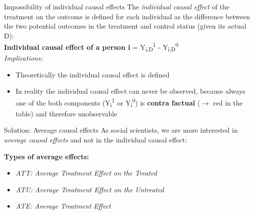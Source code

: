 \documentclass{beamer}\usepackage[]{graphicx}\usepackage[]{xcolor}
\begin{document}
\begin{frame}{Impossibility of individual causal effects}
The \textit{individual causal effect} of the treatment on the outcome is defined for each individual as the difference between the two potential outcomes in the treatment and control status (given its actual D):\\
\textbf{Individual causal effect of a person i} = Y\textsubscript{i,D}\textsuperscript{1} - Y\textsubscript{i,D}\textsuperscript{0} \\[1em]
\textit{Implications:} 
  \begin{itemize}
    \item Theoretically the individual causal effect is defined
    \item In reality the individual causal effect can never be observed, because always one of the both components (Y\textsubscript{i}\textsuperscript{1} or Y\textsubscript{i}\textsuperscript{0}) is \textbf{contra factual} ($\rightarrow$ red in the table) and therefore unobservable
  \end{itemize}
\end{frame}


\begin{frame}{Solution: Average causal effects}
As social scientists, we are more interested in \textit{average causal effects} and not in the individual causal effect:

\textbf{Types of average effects:}
  \begin{itemize}
    \item \textit{ATT: Average Treatment Effect on the Treated}
    \item \textit{ATU: Average Treatment Effect on the Untreated}
    \item \textit{ATE: Average Treatment Effect}
  \end{itemize}

\end{frame}
\end{document}
